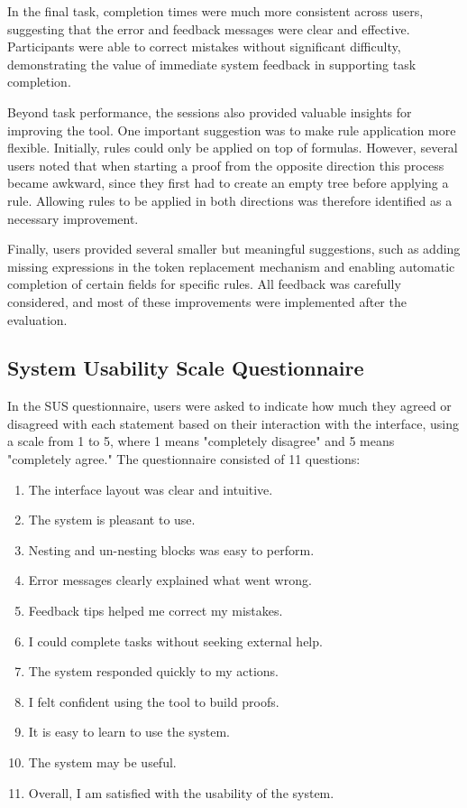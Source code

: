 In the final task, completion times were much more consistent across users, suggesting that the error and feedback messages were clear and effective. Participants were able to correct mistakes without significant difficulty, demonstrating the value of immediate system feedback in supporting task completion.  

Beyond task performance, the sessions also provided valuable insights for improving the tool. One important suggestion was to make rule application more flexible. Initially, rules could only be applied on top of formulas. However, several users noted that when starting a proof from the opposite direction this process became awkward, since they first had to create an empty tree before applying a rule. Allowing rules to be applied in both directions was therefore identified as a necessary improvement.  

Finally, users provided several smaller but meaningful suggestions, such as adding missing expressions in the token replacement mechanism and enabling automatic completion of certain fields for specific rules. All feedback was carefully considered, and most of these improvements were implemented after the evaluation.  

\subsection{System Usability Scale Questionnaire}

In the \gls{SUS} questionnaire, users were asked to indicate how much they agreed or disagreed with each statement based on their interaction with the interface, using a scale from 1 to 5, where 1 means "completely disagree" and 5 means "completely agree." The questionnaire consisted of 11 questions:

\begin{enumerate}
    \item The interface layout was clear and intuitive.
    \item The system is pleasant to use.
    \item Nesting and un-nesting blocks was easy to perform.
    \item Error messages clearly explained what went wrong.
    \item Feedback tips helped me correct my mistakes.
    \item I could complete tasks without seeking external help.
    \item The system responded quickly to my actions.
    \item I felt confident using the tool to build proofs.
    \item It is easy to learn to use the system.
    \item The system may be useful.
    \item Overall, I am satisfied with the usability of the system.
\end{enumerate}

